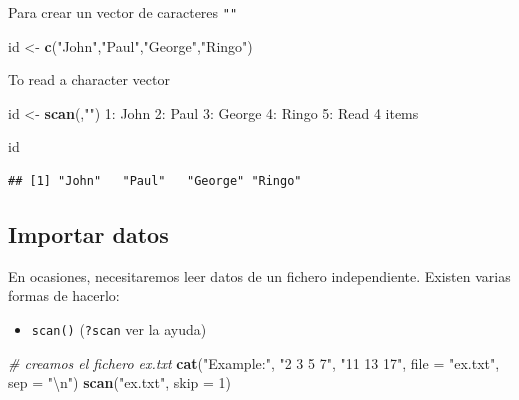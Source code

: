 \documentclass[]{article}
\def\tightlist{}
\newenvironment{Shaded}{\begin{snugshade}}{\end{snugshade}}
\newcommand{\KeywordTok}[1]{\textcolor[rgb]{0.13,0.29,0.53}{\textbf{{#1}}}}
\newcommand{\DataTypeTok}[1]{\textcolor[rgb]{0.13,0.29,0.53}{{#1}}}
\newcommand{\DecValTok}[1]{\textcolor[rgb]{0.00,0.00,0.81}{{#1}}}
\newcommand{\CharTok}[1]{\textcolor[rgb]{0.31,0.60,0.02}{{#1}}}
\newcommand{\StringTok}[1]{\textcolor[rgb]{0.31,0.60,0.02}{{#1}}}
\newcommand{\CommentTok}[1]{\textcolor[rgb]{0.56,0.35,0.01}{\textit{{#1}}}}
\newcommand{\NormalTok}[1]{{#1}}
\numberwithin{equation}{section}
\begin{document}
Para crear un vector de caracteres \texttt{""}

\begin{Shaded}
\begin{Highlighting}[]
\NormalTok{id <-}\StringTok{ }\KeywordTok{c}\NormalTok{(}\StringTok{"John"}\NormalTok{,}\StringTok{"Paul"}\NormalTok{,}\StringTok{"George"}\NormalTok{,}\StringTok{"Ringo"}\NormalTok{)}
\end{Highlighting}
\end{Shaded}

To read a character vector

\begin{Shaded}
\begin{Highlighting}[]
\NormalTok{id <-}\StringTok{ }\KeywordTok{scan}\NormalTok{(,}\StringTok{""}\NormalTok{)}
\DecValTok{1}\NormalTok{:}\StringTok{ }\NormalTok{John}
\DecValTok{2}\NormalTok{:}\StringTok{ }\NormalTok{Paul}
\DecValTok{3}\NormalTok{:}\StringTok{ }\NormalTok{George}
\DecValTok{4}\NormalTok{:}\StringTok{ }\NormalTok{Ringo}
\DecValTok{5}\NormalTok{:}\StringTok{ }
\NormalTok{Read }\DecValTok{4} \NormalTok{items  }
\end{Highlighting}
\end{Shaded}

\begin{Shaded}
\begin{Highlighting}[]
\NormalTok{id}
\end{Highlighting}
\end{Shaded}

\begin{verbatim}
## [1] "John"   "Paul"   "George" "Ringo"
\end{verbatim}

\subsection{Importar datos}\label{importar-datos}

En ocasiones, necesitaremos leer datos de un fichero independiente.
Existen varias formas de hacerlo:

\begin{itemize}
\tightlist
\item
  \texttt{scan()} (\texttt{?scan} ver la ayuda)
\end{itemize}

\begin{Shaded}
\begin{Highlighting}[]
\CommentTok{# creamos el fichero ex.txt}
\KeywordTok{cat}\NormalTok{(}\StringTok{"Example:"}\NormalTok{, }\StringTok{"2 3 5 7"}\NormalTok{, }\StringTok{"11 13 17"}\NormalTok{, }\DataTypeTok{file =} \StringTok{"ex.txt"}\NormalTok{, }\DataTypeTok{sep =} \StringTok{"}\CharTok{\textbackslash{}n}\StringTok{"}\NormalTok{) }
\KeywordTok{scan}\NormalTok{(}\StringTok{"ex.txt"}\NormalTok{, }\DataTypeTok{skip =} \DecValTok{1}\NormalTok{)}
\end{Highlighting}
\end{Shaded}
\end{document}
